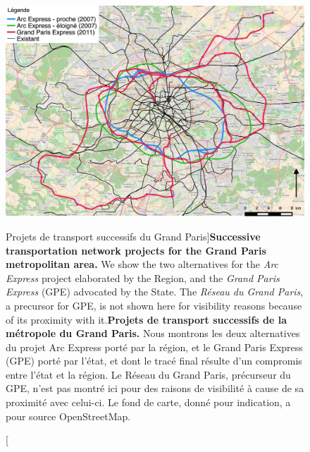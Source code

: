 \begin{figure}%
\includegraphics[width=\linewidth]{Figures/Final/1-2-1-fig-casestudies-projects.jpg}
\caption[][Projets de transport successifs du Grand Paris]{\textbf{Successive transportation network projects for the Grand Paris metropolitan area.} We show the two alternatives for the \emph{Arc Express} project elaborated by the Region, and the \emph{Grand Paris Express} (GPE) advocated by the State. The \emph{Réseau du Grand Paris}, a precursor for GPE, is not shown here for visibility reasons because of its proximity with it.\label{fig:casestudies:projects}}{\textbf{Projets de transport successifs de la métropole du Grand Paris.} Nous montrons les deux alternatives du projet Arc Express porté par la région, et le Grand Paris Express (GPE) porté par l'état, et dont le tracé final résulte d'un compromis entre l'état et la région. Le Réseau du Grand Paris, précurseur du GPE, n'est pas montré ici pour des raisons de visibilité à cause de sa proximité avec celui-ci. Le fond de carte, donné pour indication, a pour source OpenStreetMap.\label{fig:casestudies:projects}}
\end{figure}




